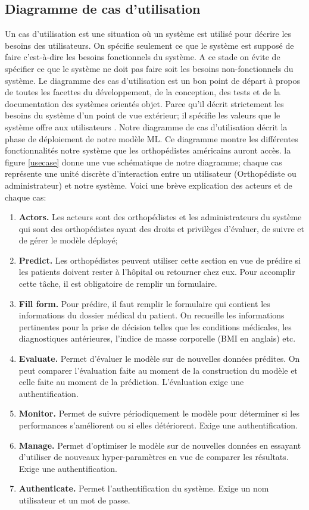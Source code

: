 \documentclass[12pt, french]{report}
\begin{document}
\subsection{Diagramme de cas d'utilisation}
Un cas d'utilisation est une situation où un système est utilisé pour décrire les besoins des utilisateurs. On spécifie seulement ce que le système est supposé de faire c'est-à-dire les besoins fonctionnels du système. A ce stade on évite de spécifier ce que le système ne doit pas faire soit les besoins non-fonctionnels du système. Le diagramme des cas d'utilisation est un bon point de départ à propos de toutes les facettes du développement, de la conception, des tests et de la documentation des systèmes orientés objet. Parce qu'il décrit strictement les besoins du système d'un point de vue extérieur; il spécifie les valeurs que le système offre aux utilisateurs \cite[~chapter 2]{key48}. 
Notre diagramme de cas d'utilisation décrit la phase de déploiement de notre modèle ML. Ce diagramme montre les différentes fonctionnalités notre système que les orthopédistes américains auront accès. la figure \ref{usecase} donne une vue schématique de notre diagramme; chaque cas représente une unité discrète d'interaction entre un utilisateur (Orthopédiste ou administrateur) et notre système. Voici une brève explication des acteurs et de chaque cas:
\begin{enumerate}
	\item \textbf{Actors.} Les acteurs sont des orthopédistes et les administrateurs du système qui sont des orthopédistes ayant des droits et privilèges d'évaluer, de suivre et de gérer le modèle déployé;
	\item \textbf{Predict.} Les orthopédistes peuvent utiliser cette section en vue de prédire si les patients doivent rester à l'hôpital ou retourner chez eux. Pour accomplir cette tâche, il est obligatoire de remplir un formulaire.
	\item \textbf{Fill form.} Pour prédire, il faut remplir le formulaire qui contient les informations du dossier médical du patient. On recueille les informations pertinentes pour la prise de décision telles que les conditions médicales, les diagnostiques antérieures, l'indice de masse corporelle (BMI en anglais) etc. 
	\item \textbf{Evaluate.} Permet d'évaluer le modèle sur de nouvelles données prédites. On peut comparer l'évaluation faite au moment de la construction du modèle et celle faite au moment de la prédiction. L'évaluation exige une authentification.  
	\item \textbf{Monitor.} Permet de suivre périodiquement le modèle pour déterminer si les performances s'améliorent ou si elles détériorent. Exige une authentification.
	\item \textbf{Manage.} Permet d'optimiser le modèle sur de nouvelles données en essayant d'utiliser de nouveaux hyper-paramètres en vue de comparer les résultats. Exige une authentification.
	\item \textbf{Authenticate.} Permet l'authentification du système. Exige un nom utilisateur et un mot de passe.
\end{enumerate}
\end{document}
